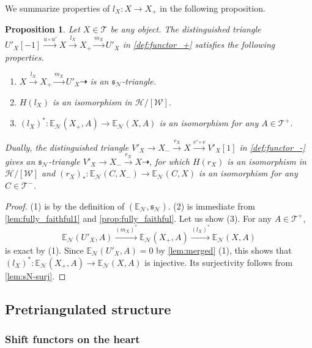 \documentclass[a4paper,reqno,10pt]{amsart}
\DeclareRobustCommand{\darkblueedit}[1]{#1}
\newtheorem{proposition}[proposition]{Proposition}
\theoremstyle{definition}
\theoremstyle{definition}
\theoremstyle{definition}
\theoremstyle{definition}
\theoremstyle{plain}
\newcommand{\fs}{\mathfrak{s}}
\newcommand{\BE}{\mathbb{E}}
\newcommand{\CH}{\mathcal{H}}
\newcommand{\CN}{\mathcal{N}}
\newcommand{\CT}{\mathcal{T}}
\newcommand{\CW}{\mathcal{W}}
\begin{document}
\color{blue}We summarize properties of $l_X\colon X\to X_+$ in the following proposition. 
\begin{proposition}\label{prop:coreflection_tri1}
Let $X\in\CT$ be any object. The distinguished triangle $U'_X[-1]\xrightarrow{u\circ u'}X\xrightarrow{l_X}X_+\xrightarrow{m_X}U'_X$ in \cref{def:functor_+} satisfies the following properties.
\begin{enumerate}
\item $X\xrightarrow{l_X}X_+\xrightarrow{m_X}U'_X\dashrightarrow$ is an $\fs_\CN$-triangle.
\item $H(l_X)$ is an isomorphism in $\CH/[\CW]$.
\item $(l_X)^{\ast}\colon\BE_{\CN}(X_+,A)\to\BE_{\CN}(X,A)$ is an isomorphism for any $A\in\CT^+$.
\end{enumerate}
Dually, the distinguished triangle $V'_X\to X_-\xrightarrow{r_X}X\xrightarrow{v'\circ v}V'_X[1]$ in \cref{def:functor_-} gives an $\fs_{\CN}$-triangle $V'_X\to X_-\xrightarrow{r_X}X\dashrightarrow$, \darkblueedit{for which} $H(r_X)$ is an isomorphism in $\CH/[\CW]$ and $(r_X)_{\ast}\colon\BE_{\CN}(C,X_-)\to\BE_{\CN}(C,X)$ is an isomorphism for any $C\in\CT^-$.
\end{proposition}
\begin{proof}
{\rm (1)} is by the definition of $(\BE_{\CN},\fs_{\CN})$. 
{\rm (2)} \darkblueedit{is immediate from} \cref{lem:fully_faithful1} and \cref{prop:fully_faithful}.
Let us show {\rm (3)}. For any $A\in\CT^+$,
\[ \BE_{\CN}(U'_X,A)\xrightarrow{(m_X)^{\ast}}\BE_{\CN}(X_+,A)\xrightarrow{(l_X)^{\ast}}\BE_{\CN}(X,A) \]
is exact by {\rm (1)}. Since $\BE_{\CN}(U'_X,A)=0$ by \cref{lem:merged} {\rm (1)}, this shows that $(l_X)^{\ast}\colon\BE_{\CN}(X_+,A)\to\BE_{\CN}(X,A)$ is injective. Its surjectivity follows from \cref{lem:sN-surj}.
\end{proof}
\normalcolor



\subsection{Pretriangulated structure}
\label{subsection:PT_heart}
\subsubsection{Shift functors on the heart}
\end{document}
